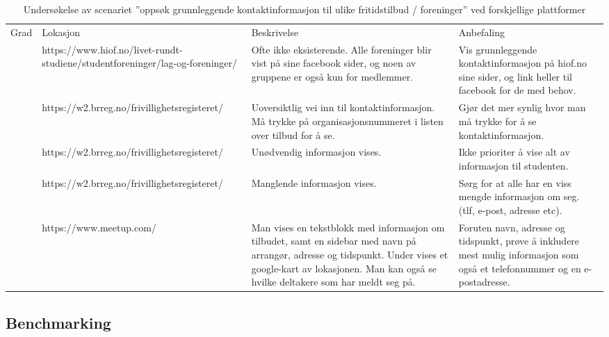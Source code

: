 \begin{center}
\begin{table}[H]
\begin{tabular}{ | m{0.7cm} | m{4cm}| m{4cm} | m{4cm} | } 
 \hline
 \centering Grad & Lokasjon & Beskrivelse & Anbefaling \\

 \centering 4 & \tiny https://www.hiof.no/livet-rundt-studiene/studentforeninger/lag-og-foreninger/ & \tiny Ofte ikke eksisterende. Alle foreninger blir vist på sine facebook sider, og noen av gruppene er også kun for medlemmer. & \tiny Vis grunnleggende kontaktinformasjon på hiof.no sine sider, og link heller til facebook for de med behov.  \\
 
 \centering 4 & \tiny https://w2.brreg.no/frivillighetsregisteret/ & \tiny Uoversiktlig vei inn til kontaktinformasjon. Må trykke på organisasjonsnummeret i listen over tilbud for å se. & \tiny Gjør det mer synlig hvor man må trykke for å se kontaktinformasjon. \\
 
 \centering 3 & \tiny https://w2.brreg.no/frivillighetsregisteret/ & \tiny Unødvendig informasjon vises. & \tiny Ikke prioriter å vise alt av informasjon til studenten. \\
 
 \centering 4 & \tiny https://w2.brreg.no/frivillighetsregisteret/ & \tiny Manglende informasjon vises. & \tiny Sørg for at alle har en viss mengde informasjon om seg. (tlf, e-post, adresse etc). \\
 
  \centering 2 & \tiny https://www.meetup.com/ & \tiny Man vises en tekstblokk med informasjon om tilbudet, samt en sidebar med navn på arrangør, adresse og tidspunkt. Under vises et google-kart av lokasjonen. Man kan også se hvilke deltakere som har meldt seg på. & \tiny Foruten navn, adresse og tidspunkt, prøve å inkludere mest mulig informasjon som også et telefonnummer og en e-postadresse. \\
 \hline
\end{tabular}
\caption{Undersøkelse av scenariet ''oppsøk grunnleggende kontaktinformasjon til ulike fritidstilbud / foreninger'' ved forskjellige plattformer}
\label{table:oppsokKontaktinfo}
\end{table}
\end{center}

\subsection{Benchmarking}


